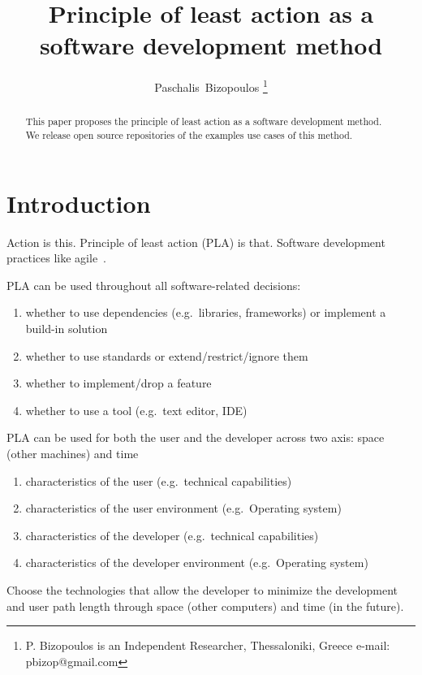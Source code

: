 \documentclass[journal]{IEEEtran}
\begin{document}
\title{Principle of least action as a software development method}

\author{Paschalis~Bizopoulos
\thanks{P. Bizopoulos is an Independent Researcher, Thessaloniki, Greece e-mail: pbizop@gmail.com}}

\maketitle

\begin{abstract}
	This paper proposes the principle of least action as a software development method.
	We release open source repositories of the examples use cases of this method.
\end{abstract}

\section{Introduction}
Action is this.
Principle of least action (PLA) is that.
Software development practices like agile~\cite{abrahamsson2017agile}.

PLA can be used throughout all software-related decisions:
\begin{enumerate}
	\item whether to use dependencies (e.g.\ libraries, frameworks) or implement a build-in solution
	\item whether to use standards or extend/restrict/ignore them
	\item whether to implement/drop a feature
	\item whether to use a tool (e.g.\ text editor, IDE)
\end{enumerate}

PLA can be used for both the user and the developer across two axis: space (other machines) and time
\begin{enumerate}
	\item characteristics of the user (e.g.\ technical capabilities)
	\item characteristics of the user environment (e.g.\ Operating system)
	\item characteristics of the developer (e.g.\ technical capabilities)
	\item characteristics of the developer environment (e.g.\ Operating system)
\end{enumerate}
Choose the technologies that allow the developer to minimize the development and user path length through space (other computers) and time (in the future).
\end{document}
